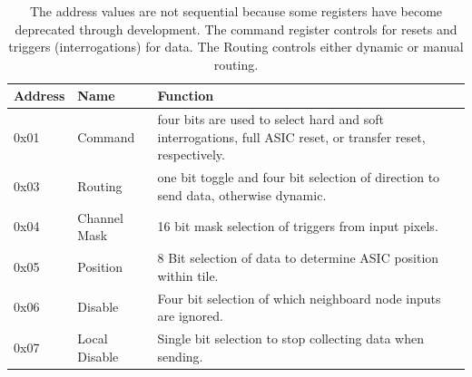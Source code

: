 \begin{table}
\begin{center}
\begin{tabular}{||p{30mm} p{30mm} p{90mm}||}
 \hline
 Address & Name & Function \\ [0.5ex]
 \hline\hline
  0x01 & Command & four bits are used to select hard and soft interrogations, full ASIC reset, or transfer reset, respectively. \\
 \hline
  0x03 & Routing & one bit toggle and four bit selection of direction to send data, otherwise dynamic. \\
 \hline
  0x04 & Channel Mask & 16 bit mask selection of triggers from input pixels. \\
 \hline
  0x05 & Position & 8 Bit selection of data to determine ASIC position within tile. \\
 \hline
  0x06 & Disable & Four bit selection of which neighboard node inputs are ignored. \\
 \hline
  0x07 & Local Disable & Single bit selection to stop collecting data when sending. \\
 \hline
\end{tabular}
\caption{The address values are not sequential because some registers have become deprecated through development.
The command register controls for resets and triggers (interrogations) for data.
The Routing controls either dynamic or manual routing.
}
\label{table:node_registers}
\end{center}
\end{table}


